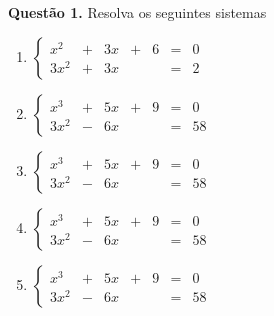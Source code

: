 \documentclass[a4paper]{article}
\begin{document}
\textbf{Questão 1.} Resolva os seguintes sistemas

\begin{multicols}{2}

\begin{enumerate}[label=\alph*)] %
    \item 
        $
        \left\{
            \begin{array}{rrrrrrr}
                x^2 & + & 3x & + & 6 & = & 0 \\
                3x^2& + & 3x &   &   & = & 2
            \end{array}
        \right.
        $

        \vspace{1cm}

    \item 
        $
        \left\{
            \begin{array}{rrrrrrr}
                x^3 & + & 5x & + & 9 & = & 0 \\
                3x^2& - & 6x &   &   & = & 58
            \end{array}
        \right.
        $

        \vspace{1cm}

        \item 
        $
        \left\{
            \begin{array}{rrrrrrr}
                x^3 & + & 5x & + & 9 & = & 0 \\
                3x^2& - & 6x &   &   & = & 58
            \end{array}
        \right.
        $

        \vspace{1cm}
    
        \item 
        $
        \left\{
            \begin{array}{rrrrrrr}
                x^3 & + & 5x & + & 9 & = & 0 \\
                3x^2& - & 6x &   &   & = & 58
            \end{array}
        \right.
        $

        \vspace{1cm}

        \item 
        $
        \left\{
            \begin{array}{rrrrrrr}
                x^3 & + & 5x & + & 9 & = & 0 \\
                3x^2& - & 6x &   &   & = & 58
            \end{array}
        \right.
        $
\end{enumerate}

\end{multicols}
\end{document}
